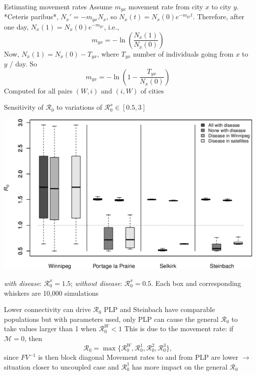 \documentclass[aspectratio=43]{beamer}
\begin{document}
\begin{frame}{Estimating movement rates}
	Assume $m_{yx}$ movement rate from city $x$ to city $y$. *Ceteris paribus*, $N_x'=-m_{yx}N_x$, so $N_x(t)=N_x(0)e^{-m_{yx}t}$. Therefore, after one day, $N_x(1)=N_x(0)e^{-m_{yx}}$, i.e.,
	$$
	m_{yx}=-\ln\left(\frac{N_x(1)}{N_x(0)}\right)
	$$
	Now, $N_x(1)=N_x(0)-T_{yx}$, where $T_{yx}$ number of individuals going from $x$ to $y$ / day. So
	$$
	m_{yx}=-\ln\left(1-\frac{T_{yx}}{N_x(0)}\right)
	$$
	Computed for all pairs $(W,i)$ and $(i,W)$ of cities
\end{frame}
	
\begin{frame}{Sensitivity of $\mathcal{R}_0$ to variations of $\mathcal{R}_0^x\in[0.5,3]$}
\begin{center}
	\includegraphics[width=\textwidth]{FIGS/sensitivity_4cities}
\end{center}
\emph{with disease}: $\mathcal{R}_0^x=1.5$; \emph{without disease}: $\mathcal{R}_0^x=0.5$. Each box and corresponding whiskers are 10,000 simulations
\end{frame}

\begin{frame}{Lower connectivity can drive $\mathcal{R}_0$}
	PLP and Steinbach have comparable populations but with parameters used, only PLP can cause the general $\mathcal{R}_0$ to take values larger than 1 when $\mathcal{R}_0^W<1$
	\vfill
	This is due to the movement rate: if $\mathcal{M}=0$, then
	$$
	\mathcal{R}_0=\max\{\mathcal{R}_0^W,\mathcal{R}_0^1,\mathcal{R}_0^2,\mathcal{R}_0^3\},
	$$
	since $FV^{-1}$ is then block diagonal
	\vfill
	Movement rates to and from PLP are lower $\rightarrow$ situation closer to uncoupled case and $\mathcal{R}_0^1$ has more impact on the general $\mathcal{R}_0$
\end{frame}
\end{document}
